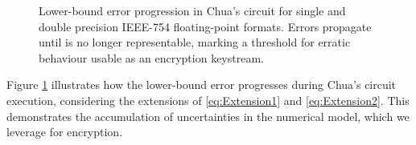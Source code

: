 \begin{figure}[ht!]
\centering

\caption{Lower-bound error progression in Chua's circuit for single and double precision IEEE-754 floating-point formats. Errors propagate until is no longer representable, marking a threshold for erratic behaviour usable as an encryption keystream.}
\label{fig:lower-bound-error}
\end{figure}
Figure \ref{fig:lower-bound-error} illustrates how the lower-bound error progresses during Chua's circuit execution, considering the extensions of \ref{eq:Extension1} and \ref{eq:Extension2}. This demonstrates the accumulation of uncertainties in the numerical model, which we leverage for encryption.
